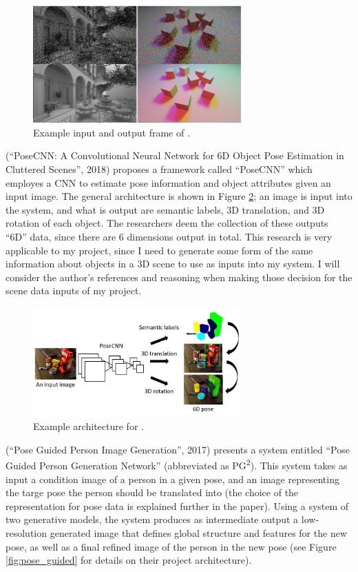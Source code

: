 \documentclass[conference]{IEEEtran}
\begin{document}
\begin{figure}[htbp]
\centerline{\includegraphics[width=8cm]{spatiotemporal.png}}
\caption{Example input and output frame of \cite{ref:spatiotemporal}.}
\label{fig:spatiotemporal}
\end{figure}

\cite{ref:posecnn} (``PoseCNN: A Convolutional Neural Network for 6D Object Pose Estimation in
Cluttered Scenes'', 2018) proposes a framework called ``PoseCNN'' which
employes a CNN to estimate pose information and object attributes given an input
image. The general architecture is shown in Figure \ref{fig:posecnn}; an image
is input into the system, and what is output are semantic labels, 3D
translation, and 3D rotation of each object. The researchers deem the collection
of these outputs ``6D'' data, since there are 6 dimensions output in total. This
research is very applicable to my project, since I need to generate some form of
the same information about objects in a 3D scene to use as inputs into my
system. I will consider the author's references and reasoning when making those
decision for the scene data inputs of my project.

\begin{figure}[htbp]
\centerline{\includegraphics[width=8cm]{posecnn.png}}
\caption{Example architecture for \cite{ref:posecnn}.}
\label{fig:posecnn}
\end{figure}

\cite{ref:pose_guided} (``Pose Guided Person Image Generation'', 2017)
presents a system entitled
``Pose Guided Person Generation Network'' (abbreviated as
PG\textsuperscript{2}). This system takes as input a condition image
of a person in a given pose, and an image representing the targe pose the person
should be translated into (the choice of the representation for pose data is explained further in the
paper). Using a system of two generative models,
the system produces as intermediate output a low-resolution generated
image that defines global structure and features for the new pose, as well as a final refined
image of the person in the new pose (see Figure \ref{fig:pose_guided} for
details on their project architecture).
\end{document}
